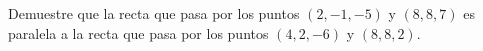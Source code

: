 \item Demuestre que la recta que pasa por los puntos $(2, -1, -5)$ y $(8, 8, 7)$ es paralela a la recta que pasa por los puntos $(4, 2, -6)$ y $(8, 8, 2)$.
